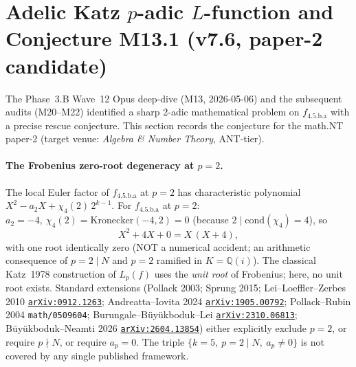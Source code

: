 \documentclass[a4paper,11pt]{article}
\newcommand{\arXiv}[1]{\href{https://arxiv.org/abs/#1}{\texttt{arXiv:#1}}}
\newcommand{\fLM}{f_{\text{4.5.b.a}}}
\newcommand{\Qi}{\mathbb{Q}(i)}
\theoremstyle{definition}
\theoremstyle{remark}
\begin{document}
\section{Adelic Katz $p$-adic $L$-function and Conjecture M13.1 (v7.6, paper-2 candidate)}
\label{sec:adelic-M13}

The Phase~3.B Wave~12 Opus deep-dive (M13, 2026-05-06) and the
subsequent audits (M20--M22) identified a sharp 2-adic mathematical
problem on $\fLM$ with a precise rescue conjecture.  This section
records the conjecture for the math.NT paper-2 (target venue:
\emph{Algebra \& Number Theory}, ANT-tier).

\paragraph{The Frobenius zero-root degeneracy at $p=2$.}
The local Euler factor of $\fLM$ at $p=2$ has characteristic polynomial
$X^{2}-a_{2}X+\chi_{4}(2)\,2^{k-1}$.  For $\fLM$ at $p=2$:
$a_{2}=-4,\ \chi_{4}(2)=\mathrm{Kronecker}(-4,2)=0$ (because
$2\mid\mathrm{cond}(\chi_{4})=4$), so
\[
X^{2}+4X+0 = X\,(X+4),
\]
with one root identically zero (NOT a numerical accident; an
arithmetic consequence of $p=2\mid N$ and $p=2$ ramified in $K=\Qi$).
The classical Katz~1978 construction of $L_{p}(f)$ uses the
\emph{unit root} of Frobenius; here, no unit root exists.  Standard
extensions (Pollack 2003; Sprung 2015; Lei--Loeffler--Zerbes 2010
\arXiv{0912.1263}; Andreatta--Iovita 2024 \arXiv{1905.00792};
Pollack--Rubin 2004 \texttt{math/0509604}; Burungale--Büyükboduk--Lei
\arXiv{2310.06813}; Büyükboduk--Neamti 2026 \arXiv{2604.13854})
either explicitly exclude $p=2$, or require $p\nmid N$, or require
$a_{p}=0$.  The triple
$\{k=5,\ p=2\mid N,\ a_{p}\neq 0\}$ is not covered by any single
published framework.
\end{document}
